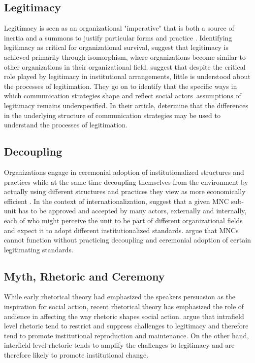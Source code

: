 \documentclass[12pt]{article}
\begin{document}
\subsection{Legitimacy}
Legitimacy is seen as an organizational "imperative" that is both a source of inertia and a summons to justify particular forms and practice \citep{Selznick1996}. Identifying legitimacy as critical for organizational survival, \citep{Kostova2008} suggest that legitimacy is achieved primarily through isomorphism, where organizations become similar to other organizations in their organizational field.  \cite{Harmon2015} suggest that despite the critical role played by legitimacy in institutional arrangements, little is understood about the processes of legitimation. They go on to identify that the specific ways in which communication strategies shape and reflect social actors\textquotesingle \ assumptions of legitimacy remains underspecified. In their article, \cite{Harmon2015} determine that the differences in the underlying structure of communication strategies may be used to understand the processes of legitimation.

\subsection{Decoupling}
Organizations engage in ceremonial adoption of institutionalized structures and practices while at the same time decoupling themselves from the environment by actually using different structures and practices they view as more economically efficient \citep{Kostova2008}. In the context of internationalization, \cite{Kostova2008} suggest that a given MNC sub-unit has to be approved and accepted by many actors, externally and internally, each of who might perceive the unit to be part of different organizational fields and expect it to adopt different institutionalized standards. \cite{Kostova2008}  argue that MNCs cannot function without practicing decoupling and ceremonial adoption of certain legitimating standards.


\subsection{Myth, Rhetoric and Ceremony}
While early rhetorical theory had emphasized the speaker\textquotesingle s persuasion as the inspiration for social action, recent rhetorical theory has emphasized the role of audience in affecting the way rhetoric shapes social action. \cite{Harmon2015} argue that intrafield level rhetoric tend to restrict and suppress challenges to legitimacy and therefore tend to promote institutional reproduction and maintenance. On the other hand, interfield level rhetoric tends to amplify the challenges to legitimacy and are therefore likely to promote institutional change.
\end{document}
